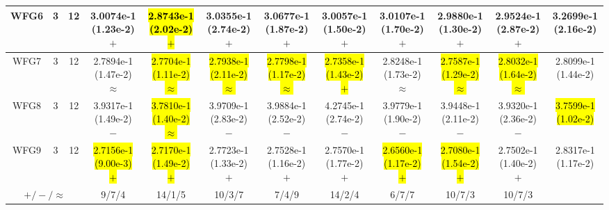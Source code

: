 \documentclass[journal]{IEEEtran}
\begin{document}
\begin{table*}[htbp]
\begin{tabular}{cccccccccccc}
\hline
\multirow{1}{*}{WFG6}&3&12&3.0074e-1 (1.23e-2) $+$&\hl{2.8743e-1 (2.02e-2) $+$}&3.0355e-1 (2.74e-2) $+$&3.0677e-1 (1.87e-2) $+$&3.0057e-1 (1.50e-2) $+$&3.0107e-1 (1.70e-2) $+$&2.9880e-1 (1.30e-2) $+$&2.9524e-1 (2.87e-2) $+$&3.2699e-1 (2.16e-2)\\
\hline
\multirow{1}{*}{WFG7}&3&12&2.7894e-1 (1.47e-2) $\approx$&\hl{2.7704e-1 (1.11e-2) $\approx$}&\hl{2.7938e-1 (2.11e-2) $\approx$}&\hl{2.7798e-1 (1.17e-2) $\approx$}&\hl{2.7358e-1 (1.43e-2) $+$}&2.8248e-1 (1.73e-2) $\approx$&\hl{2.7587e-1 (1.29e-2) $\approx$}&\hl{2.8032e-1 (1.64e-2) $\approx$}&2.8099e-1 (1.44e-2)\\
\hline
\multirow{1}{*}{WFG8}&3&12&3.9317e-1 (1.49e-2) $-$&\hl{3.7810e-1 (1.40e-2) $\approx$}&3.9709e-1 (2.83e-2) $-$&3.9884e-1 (2.52e-2) $-$&4.2745e-1 (2.74e-2) $-$&3.9779e-1 (1.90e-2) $-$&3.9448e-1 (2.11e-2) $-$&3.9320e-1 (2.36e-2) $-$&\hl{3.7599e-1 (1.02e-2)}\\
\hline
\multirow{1}{*}{WFG9}&3&12&\hl{2.7156e-1 (9.00e-3) $+$}&\hl{2.7170e-1 (1.49e-2) $+$}&2.7723e-1 (1.33e-2) $+$&2.7528e-1 (1.16e-2) $+$&2.7570e-1 (1.77e-2) $+$&\hl{2.6560e-1 (1.17e-2) $+$}&\hl{2.7080e-1 (1.54e-2) $+$}&2.7502e-1 (1.40e-2) $+$&2.8317e-1 (1.17e-2)\\
\hline
\multicolumn{3}{c}{$+/-/\approx$}&9/7/4&14/1/5&10/3/7&7/4/9&14/2/4&6/7/7&10/7/3&10/7/3&\\
\bottomrule
\end{tabular}
\label{No Label}
\end{table*}
\end{document}
